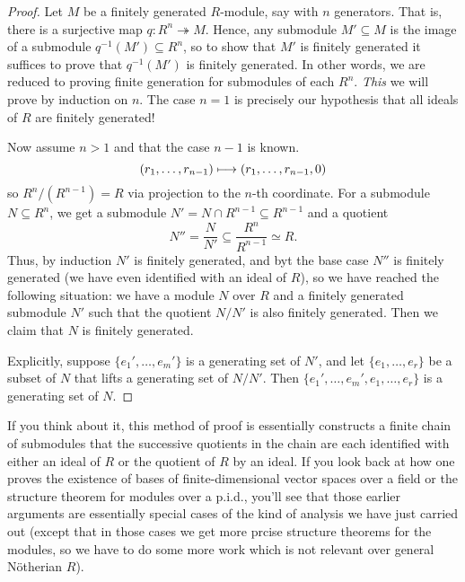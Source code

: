 \begin{proof}
  Let \(M\) be a finitely generated \(R\)-module, say with \(n\)
  generators. That is, there is a surjective map \(q\colon
  R^n\twoheadrightarrow M\). Hence, any submodule \(M'\subseteq M\) is the
  image of a submodule \(q^{-1}(M')\subseteq R^n\), so to show that \(M'\)
  is finitely generated it suffices to prove that \(q^{-1}(M')\) is
  finitely generated. In other words, we are reduced to proving finite
  generation for submodules of each \(R^n\). \emph{This} we will prove by
  induction on \(n\). The case \(n=1\) is precisely our hypothesis that all
  ideals of \(R\) are finitely generated!

  Now assume \(n>1\) and that the case \(n-1\) is known.
  \[
    (r_1,\dotsc,r_{n-1})\longmapsto (r_1,\dotsc,r_{n-1},0)
  \]
  so \(R^n/(R^{n-1})=R\) via projection to the \(n\)-th coordinate. For a
  submodule \(N\subseteq R^n\), we get a submodule \(N'=N\cap
  R^{n-1}\subseteq R^{n-1}\) and a quotient
  \[
    N''=\frac{N}{N'}\subseteq\frac{R^n}{R^{n-1}}\simeq R.
  \]
  Thus, by induction \(N'\) is finitely generated, and byt the base case
  \(N''\) is finitely generated (we have even identified with an ideal of
  \(R\)), so we have reached the following situation: we have a module
  \(N\) over \(R\) and a finitely generated submodule \(N'\) such that the
  quotient \(N/N'\) is also finitely generated. Then we claim that \(N\) is
  finitely generated.

  Explicitly, suppose \(\{e_1',\dotsc,e_m'\}\) is a generating set of
  \(N'\), and let \(\{e_1,\dotsc,e_r\}\) be a subset of \(N\) that lifts a
  generating set of \(N/N'\). Then \(\{e_1',\dotsc,e_m',e_1,\dotsc,e_r\}\)
  is a generating set of \(N\).
\end{proof}

If you think about it, this method of proof is essentially constructs a
finite chain of submodules that the successive quotients in the chain are
each identified with either an ideal of \(R\) or the quotient of \(R\) by
an ideal. If you look back at how one proves the existence of bases of
finite-dimensional vector spaces over a field or the structure theorem for
modules over a p.i.d., you'll see that those earlier arguments are
essentially special cases of the kind of analysis we have just carried out
(except that in those cases we get more prcise structure theorems for the
modules, so we have to do some more work which is not relevant over general
Nötherian \(R\)).

